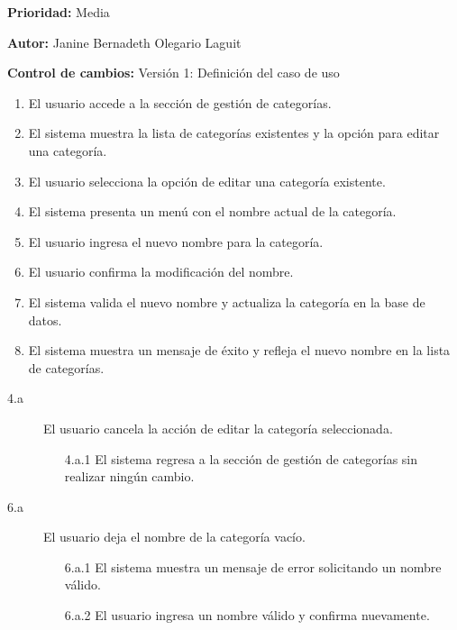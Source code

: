\textbf{Prioridad: }
Media
\vspace{0.15cm}

\textbf{Autor: }
Janine Bernadeth Olegario Laguit\par
\vspace{0.15cm}

\textbf{Control de cambios: } Versión 1: Definición del caso de uso

\begin{enumerate}
    \item El usuario accede a la sección de gestión de categorías.
    \item El sistema muestra la lista de categorías existentes y la opción para editar una categoría.
    \item El usuario selecciona la opción de editar una categoría existente.
    \item El sistema presenta un menú con el nombre actual de la categoría.
    \item El usuario ingresa el nuevo nombre para la categoría.
    \item El usuario confirma la modificación del nombre.
    \item El sistema valida el nuevo nombre y actualiza la categoría en la base de datos.
    \item El sistema muestra un mensaje de éxito y refleja el nuevo nombre en la lista de categorías.
\end{enumerate}

\begin{description}
    \item[4.a] El usuario cancela la acción de editar la categoría seleccionada.
    \begin{enumerate}
        \item[4.a.1] El sistema regresa a la sección de gestión de categorías sin realizar ningún cambio.
    \end{enumerate}

    \item[6.a] El usuario deja el nombre de la categoría vacío.
    \begin{enumerate}
        \item[6.a.1] El sistema muestra un mensaje de error solicitando un nombre válido.
        \item[6.a.2] El usuario ingresa un nombre válido y confirma nuevamente.
    \end{enumerate}
\end{description}

